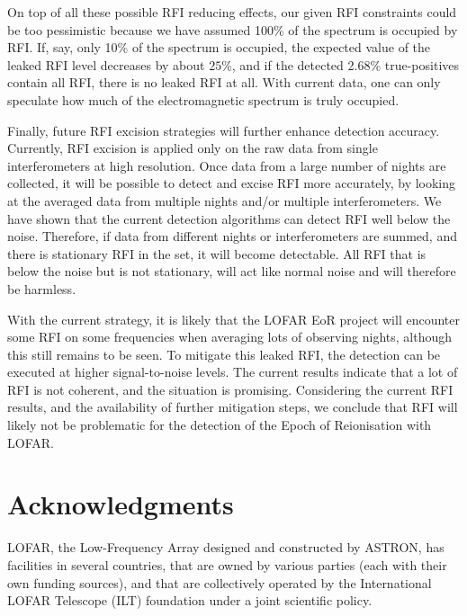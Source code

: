 \documentclass[useAMS,usenatbib]{mn2e}
\begin{document}
On top of all these possible RFI reducing effects, our given RFI constraints could be too pessimistic because we have assumed 100\% of the spectrum is occupied by RFI. If, say, only 10\% of the spectrum is occupied, the expected value of the leaked RFI level decreases by about $25$\%, and if the detected 2.68\% true-positives contain all RFI, there is no leaked RFI at all. With current data, one can only speculate how much of the electromagnetic spectrum is truly occupied.

Finally, future RFI excision strategies will further enhance detection accuracy. Currently, RFI excision is applied only on the raw data from single interferometers at high resolution. Once data from a large number of nights are collected, it will be possible to detect and excise RFI more accurately, by looking at the averaged data from multiple nights and/or multiple interferometers. We have shown that the current detection algorithms can detect RFI well below the noise. Therefore, if data from different nights or interferometers are summed, and there is stationary RFI in the set, it will become detectable. All RFI that is below the noise but is not stationary, will act like normal noise and will therefore be harmless.

With the current strategy, it is likely that the LOFAR EoR project will encounter some RFI on some frequencies when averaging lots of observing nights, although this still remains to be seen. To mitigate this leaked RFI, the detection can be executed at higher signal-to-noise levels. The current results indicate that a lot of RFI is not coherent, and the situation is promising. Considering the current RFI results, and the availability of further mitigation steps, we conclude that RFI will likely not be problematic for the detection of the Epoch of Reionisation with LOFAR.

\label{lastpage}
\section*{Acknowledgments}
LOFAR, the Low-Frequency Array designed and constructed by ASTRON, has facilities in several countries, that are owned by various parties (each with their own funding sources), and that are collectively operated by the International LOFAR Telescope (ILT) foundation under a joint scientific policy.

\appendix
\end{document}
